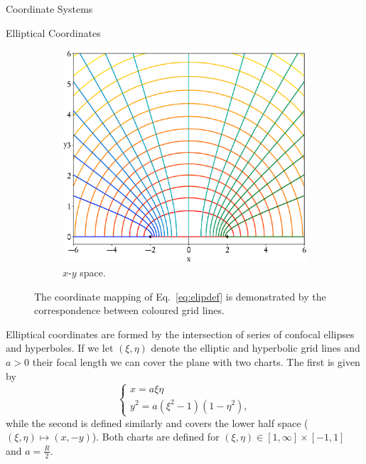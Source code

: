 \documentclass[a5paper, 9 pt]{extreport}
\begin{document}
\begin{appendices}
\begin{chapter}{Coordinate Systems \label{chap:coords}}
\begin{section}{Elliptical Coordinates \label{sec:elliptic}}
\begin{figure}[t]
\begin{subfigure}{.5\textwidth}
               \includegraphics[width=\linewidth]{./images/appendix/eliptical.eps}
               \caption{$x$-$y$ space. \label{fig:xy}}
            \end{subfigure}
            \caption[Coordinate chart of elliptical coordinates]{The coordinate mapping of
                     Eq.~\eqref{eq:elipdef} is demonstrated by the correspondence between
                     coloured grid lines.\label{fig:elliptic}}
         \end{figure}

         Elliptical coordinates are formed by the intersection of series of confocal ellipses and
         hyperboles. If we let $(\xi, \eta)$ denote the elliptic and hyperbolic grid lines and $a > 0$
         their focal length we can cover the plane with two charts. The first is given by
         \begin{equation} \label{eq:elipdef}
            \left\{
            \begin{array}{l}
               x   = a \xi \eta \\
               y^2 = a \left( \xi^2 - 1 \right) \left( 1 - \eta^2 \right),
            \end{array}
            \right.
         \end{equation}
         while the second is defined similarly and covers the lower half space ($(\xi,\eta) \mapsto
         (x,-y)$). Both charts are defined for $(\xi,\eta) \in [1, \infty] \times [-1,1]$ and
         $a = \frac{R}{2}$.


\end{section}
\end{chapter}
\end{appendices}
\end{document}
